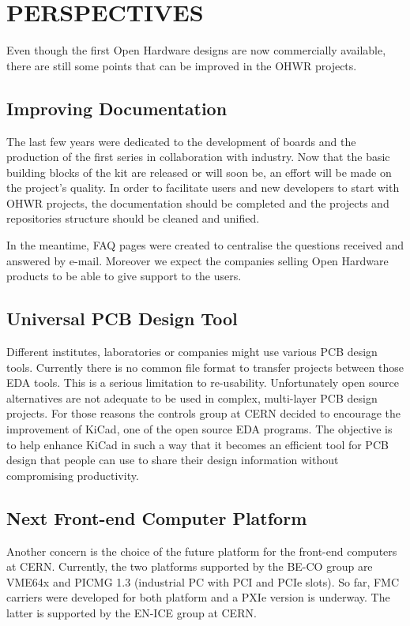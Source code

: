 \documentclass{JAC2003}
\begin{document}
\section{PERSPECTIVES}
Even though the first Open Hardware designs are now commercially available, there are still some points that can be improved in the OHWR projects.

\subsection{Improving Documentation}
The last few years were dedicated to the development of boards and the production of the first series in collaboration with industry.
Now that the basic building blocks of the kit are released or will soon be, an effort will be made on the project's quality.
In order to facilitate users and new developers to start with OHWR projects, the documentation should be completed and the projects and repositories structure should be cleaned and unified.

In the meantime, FAQ pages were created to centralise the questions received and answered by e-mail.
Moreover we expect the companies selling Open Hardware products to be able to give support to the users.

\subsection{Universal PCB Design Tool}
Different institutes, laboratories or companies might use various PCB design tools.
Currently there is no common file format to transfer projects between those EDA tools.
This is a serious limitation to re-usability.
Unfortunately open source alternatives are not adequate to be used in complex, multi-layer PCB design projects.
For those reasons the controls group at CERN decided to encourage the improvement of KiCad, one of the open source EDA programs.
The objective is to help enhance KiCad in such a way that it becomes an efficient tool for PCB design that people can use to share their design information without compromising productivity.

\subsection{Next Front-end Computer Platform}
Another concern is the choice of the future platform for the front-end computers at CERN.
Currently, the two platforms supported by the BE-CO group are VME64x and PICMG 1.3 (industrial PC with PCI and PCIe slots).
So far, FMC carriers were developed for both platform and a PXIe version is underway.
The latter is supported by the EN-ICE group at CERN.
\end{document}
